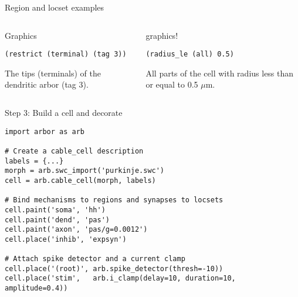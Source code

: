 \documentclass[aspectratio=43]{beamer}
\begin{document}
\begin{frame}[fragile]{Region and locset examples}
    \begin{columns}[T]
        \begin{column}{0.5\textwidth}
            Graphics

            \vspace{10pt}

            \begin{lstlisting}[style=arblang]
(restrict (terminal) (tag 3))
            \end{lstlisting}

            The tips (terminals) of the dendritic arbor (tag 3).

        \end{column}
        \begin{column}{0.5\textwidth}
            graphics!

            \vspace{10pt}

            \begin{lstlisting}[style=arblang]
(radius_le (all) 0.5)
            \end{lstlisting}
            All parts of the cell with radius less than or equal to 0.5 $\mu$m.

        \end{column}
    \end{columns}
\end{frame}

\begin{frame}[fragile]{Step 3: Build a cell and decorate}
    \begin{lstlisting}[style=talkpython]
import arbor as arb

# Create a cable_cell description
labels = {...}
morph = arb.swc_import('purkinje.swc')
cell = arb.cable_cell(morph, labels)

# Bind mechanisms to regions and synapses to locsets
cell.paint('soma', 'hh')
cell.paint('dend', 'pas')
cell.paint('axon', 'pas/g=0.0012')
cell.place('inhib', 'expsyn')

# Attach spike detector and a current clamp
cell.place('(root)', arb.spike_detector(thresh=-10))
cell.place('stim',   arb.i_clamp(delay=10, duration=10, amplitude=0.4))
    \end{lstlisting}
\end{frame}
\end{document}
